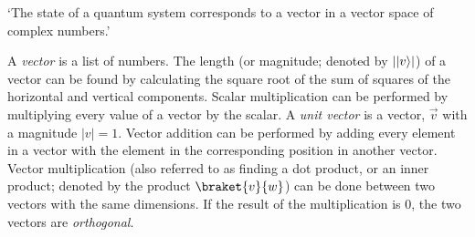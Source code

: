 
`The state of a quantum system corresponds to a vector in a vector space of complex numbers.'

\begin{definition}
  A \emph{vector} is a list of numbers.
  The length (or magnitude; denoted by $\lvert\lvert v\rangle\rvert$) of a vector can be found by calculating the square root of the sum of squares of the horizontal and vertical components.
  Scalar multiplication can be performed by multiplying every value of a vector by the scalar. A \emph{unit vector} is a vector, $\vec{v}$ with a magnitude $\lvert v \rvert = 1$.
  Vector addition can be performed by adding every element in a vector with the element in the corresponding position in another vector.
  Vector multiplication (also referred to as finding a dot product, or an inner product; denoted by the product $\braket{v}{w}$) can be done between two vectors with the same dimensions. If the result of the multiplication is $0$, the two vectors are \emph{orthogonal}.
\end{definition}
